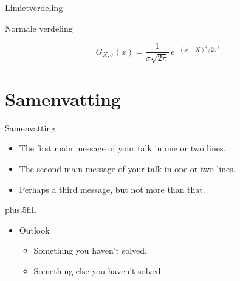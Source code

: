 \documentclass{beamer}
\begin{document}
\begin{frame}{Limietverdeling}
  \begin{center}





  \end{center}
\end{frame}

\begin{frame}[label=wip]{Normale verdeling}
  \begin{center}
  \end{center}
  \begin{equation*}
    G_{X,\sigma}(x) = \frac{1}{\sigma\sqrt{2\pi}}\,e^{-(x - X)^2 / 2\sigma^2}
  \end{equation*}
\end{frame}


\section*{Samenvatting}

\begin{frame}{Samenvatting}

  \begin{itemize}
  \item
    The \alert{first main message} of your talk in one or two lines.
  \item
    The \alert{second main message} of your talk in one or two lines.
  \item
    Perhaps a \alert{third message}, but not more than that.
  \end{itemize}

  \vskip0pt plus.5fill
  \begin{itemize}
  \item
    Outlook
    \begin{itemize}
    \item
      Something you haven't solved.
    \item
      Something else you haven't solved.
    \end{itemize}
  \end{itemize}
\end{frame}
\end{document}
